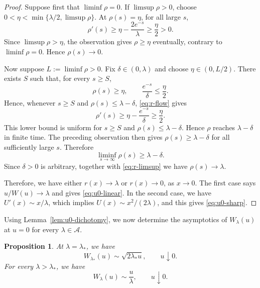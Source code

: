 \documentclass[12pt,preprint]{amsart}
\numberwithin{equation}{section}
\theoremstyle{plain}
\newtheorem{proposition}[theorem]{Proposition}
\theoremstyle{definition}
\begin{document}
\begin{proof}
Suppose first that \(\liminf\rho=0\).  If \(\limsup\rho>0\), choose
\(0<\eta<\min\{\lambda/2,\limsup\rho\}\).  At \(\rho(s)=\eta\), for all large \(s\),
\[
 \rho'(s)\ge\eta-\frac{2e^{-s}}\lambda\ge\frac\eta2>0.
\]
Since \(\limsup\rho>\eta\), the observation gives \(\rho\ge\eta\) eventually,
contrary to \(\liminf\rho=0\).  Hence \(\rho(s)\to0\).

Now suppose \(L:=\liminf\rho>0\).  Fix \(\delta\in(0,\lambda)\) and choose
\(\eta\in(0,L/2)\).  There exists \(S\) such that, for every \(s\ge S\),
\[
 \rho(s)\ge\eta,
 \qquad
 \frac{e^{-s}}\delta\le\frac\eta2.
\]
Hence, whenever \(s\ge S\) and \(\rho(s)\le\lambda-\delta\),
\eqref{eq:r-flow} gives
\[
 \rho'(s)
 \ge\eta-\frac{e^{-s}}\delta
 \ge\frac\eta2.
\]
This lower bound is uniform for $s\ge S$ and
$\rho(s)\le\lambda-\delta$.  Hence $\rho$ reaches
$\lambda-\delta$ in finite time.  The preceding observation then gives
\(\rho(s)\ge\lambda-\delta\) for all sufficiently large \(s\).  Therefore
\[
 \liminf_{s\to\infty}\rho(s)\ge\lambda-\delta.
\]
Since \(\delta>0\) is arbitrary, together with \eqref{eq:r-limsup} we have
\(\rho(s)\to\lambda\).

Therefore, we have either \(r(x)\to \lambda\) or \(r(x)\to0\), as \(x\to 0\).  The first case says
\(u/W(u)\to \lambda\) and gives \eqref{eq:u0-linear}.  In the second case, we have
\(U'(x)\sim x/\lambda\), which implies
\(U(x)\sim x^2/(2\lambda)\), and this gives
\eqref{eq:u0-sharp}.
\end{proof}

Using Lemma~\ref{lem:u0-dichotomy}, we now determine the asymptotics of
$W_\lambda(u)$ at $u=0$ for every $\lambda\in\mathcal A$.

\begin{proposition}
\label{prop:critical-branches}
At \(\lambda = \lambda_*\), we have
\begin{equation}
 W_{\lambda_*}(u)\sim\sqrt{2\lambda_*u},
 \qquad u\downarrow0.
 \label{eq:critical-sharp-branch}
\end{equation}
For every \(\lambda>\lambda_*\), we have
\begin{equation}
 W_\lambda(u)\sim\frac u\lambda,
 \qquad u\downarrow0.
 \label{eq:supercritical-linear-branch}
\end{equation}
\end{proposition}
\end{document}
